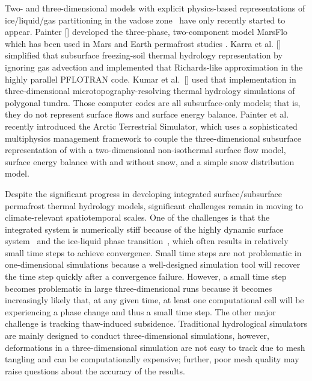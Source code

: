 \documentclass[review,11pt]{elsarticle}
\begin{document}
Two- and three-dimensional models with explicit physics-based representations of ice/liquid/gas partitioning in the vadose zone~\cite{painter2014constitutive} have only recently started to appear. Painter [\citeyear{marsflo}] developed the three-phase, two-component model MarsFlo which has been used in Mars \cite{grimm2009mars} and Earth permafrost studies \cite{frampton2011}.  Karra et al. [\citeyear{karra2014three}] simplified that subsurface freezing-soil thermal hydrology representation by ignoring gas advection and implemented that Richards-like approximation in the highly parallel PFLOTRAN \cite{pflotran-web-page} code. Kumar et al.~[\citeyear{kumar2016modeling}] used that implementation in three-dimensional microtopography-resolving thermal hydrology simulations of polygonal tundra. Those computer codes are all subsurface-only models; that is, they do not represent surface flows and surface energy balance. Painter et al. \citeyear{spainter2016integrated} recently introduced the Arctic Terrestrial Simulator, which uses a sophisticated multiphysics management framework \cite{ecoon2016managing} to couple the three-dimensional subsurface representation of \cite{karra2014three} with a two-dimensional non-isothermal surface flow model, surface energy balance with and without snow, and a simple snow distribution model. 

Despite the significant progress in developing integrated surface/subsurface permafrost thermal hydrology models, significant challenges remain in moving to climate-relevant spatiotemporal scales. One of the challenges is that the integrated system is numerically stiff because of the highly dynamic surface system~\cite{spainter2016integrated} and the ice-liquid phase transition~\cite{dall2011robust}, which often results in relatively small time steps to achieve convergence. Small time steps are not problematic in one-dimensional simulations because a well-designed simulation tool will recover the time step quickly after a convergence failure. However, a small time step becomes problematic in large three-dimensional runs because it becomes increasingly likely that, at any given time, at least one computational cell will be experiencing a phase change and thus a small time step. The other major challenge is tracking thaw-induced subsidence. Traditional hydrological simulators are mainly designed to conduct three-dimensional simulations, however, deformations in a three-dimensional simulation are not easy to track due to mesh tangling and can be computationally expensive; further, poor mesh quality may raise questions about the accuracy of the results. 
\end{document}
